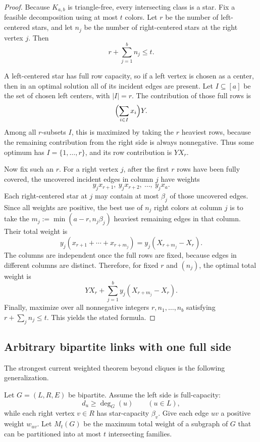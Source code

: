 \documentclass[11pt]{article}
\theoremstyle{definition}
\begin{document}
\begin{proof}
Because \(K_{a,b}\) is triangle-free, every intersecting class is a star. Fix a feasible decomposition using at most \(t\) colors. Let \(r\) be the number of left-centered stars, and let \(n_j\) be the number of right-centered stars at the right vertex \(j\). Then
\[
r+\sum_{j=1}^b n_j\le t.
\]

A left-centered star has full row capacity, so if a left vertex is chosen as a center, then in an optimal solution all of its incident edges are present. Let \(I\subseteq [a]\) be the set of chosen left centers, with \(|I|=r\). The contribution of those full rows is
\[
\Bigl(\sum_{i\in I}x_i\Bigr)Y.
\]
Among all \(r\)-subsets \(I\), this is maximized by taking the \(r\) heaviest rows, because the remaining contribution from the right side is always nonnegative. Thus some optimum has \(I=\{1,\dots,r\}\), and its row contribution is \(YX_r\).

Now fix such an \(r\). For a right vertex \(j\), after the first \(r\) rows have been fully covered, the uncovered incident edges in column \(j\) have weights
\[
y_jx_{r+1},\ y_jx_{r+2},\ \dots,\ y_jx_a.
\]
Each right-centered star at \(j\) may contain at most \(\beta_j\) of those uncovered edges. Since all weights are positive, the best use of \(n_j\) right colors at column \(j\) is to take the \(m_j:=\min(a-r,n_j\beta_j)\) heaviest remaining edges in that column. Their total weight is
\[
y_j(x_{r+1}+\cdots+x_{r+m_j})=y_j(X_{r+m_j}-X_r).
\]
The columns are independent once the full rows are fixed, because edges in different columns are distinct. Therefore, for fixed \(r\) and \((n_j)\), the optimal total weight is
\[
YX_r+\sum_{j=1}^b y_j(X_{r+m_j}-X_r).
\]
Finally, maximize over all nonnegative integers \(r,n_1,\dots,n_b\) satisfying \(r+\sum_j n_j\le t\). This yields the stated formula.
\end{proof}

\subsection{Arbitrary bipartite links with one full side}
The strongest current weighted theorem beyond cliques is the following generalization.

Let \(G=(L,R,E)\) be bipartite. Assume the left side is full-capacity:
\[
d_u\ge \deg_G(u)\qquad(u\in L),
\]
while each right vertex \(v\in R\) has star-capacity \(\beta_v\). Give each edge \(uv\) a positive weight \(w_{uv}\). Let \(M_t(G)\) be the maximum total weight of a subgraph of \(G\) that can be partitioned into at most \(t\) intersecting families.
\end{document}
